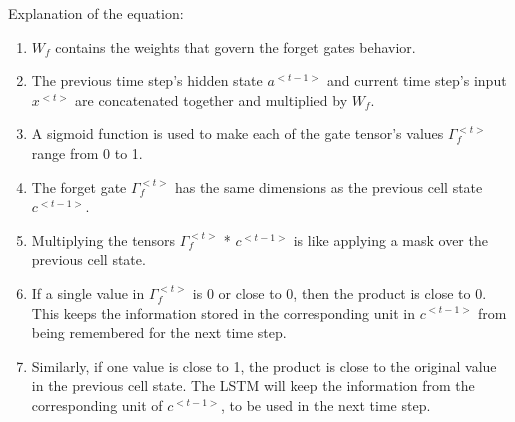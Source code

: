 Explanation of the equation:
\begin{enumerate}
    \item $W_f$ contains the weights that govern the forget gate\textquotesingle s behavior.
    \item The previous time step's hidden state $a^{<t - 1>}$  and current time step's input $x^{<t>}$ are concatenated together and multiplied by $W_f$.
    \item A sigmoid function is used to make each of the gate tensor's values $\Gamma _f ^ {<t>}$ range from 0 to 1.
    \item The forget gate $\Gamma _f ^ {<t>}$
    has the same dimensions as the previous cell state $c^{<t - 1>}$.
    \item Multiplying the tensors $\Gamma _f ^ {<t>}$ * $c^{<t - 1>}$
 is like applying a mask over the previous cell state.
    \item If a single value in $\Gamma _f ^ {<t>}$ is 0 or close to 0, then the product is close to 0. This keeps the information stored in the corresponding unit in $c^{<t - 1>}$ from being remembered for the next time step.
    \item Similarly, if one value is close to 1, the product is close to the original value in the previous cell state. The LSTM will keep the information from the corresponding unit of $c^{<t - 1>}$, to be used in the next time step.
\end{enumerate}

